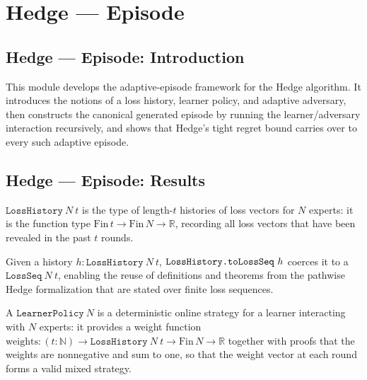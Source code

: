 \section{Hedge --- Episode}
\subsection*{Hedge --- Episode: Introduction}

This module develops the adaptive-episode framework for the Hedge algorithm.
It introduces the notions of a loss history, learner policy, and adaptive adversary,
then constructs the canonical generated episode by running the learner/adversary
interaction recursively, and shows that Hedge's tight regret bound carries over
to every such adaptive episode.

\subsection*{Hedge --- Episode: Results}

\begin{definition}
\label{LossHistory}
\leanok
$\texttt{LossHistory}\ N\ t$ is the type of length-$t$ histories of loss vectors
for $N$ experts: it is the function type $\mathrm{Fin}\,t \to \mathrm{Fin}\,N \to \mathbb{R}$,
recording all loss vectors that have been revealed in the past $t$ rounds.
\end{definition}

\begin{definition}
\label{LossHistory.toLossSeq}
\leanok
{}
Given a history $h : \texttt{LossHistory}\ N\ t$, $\text{\texttt{LossHistory.toLossSeq}}\ h$ coerces it
to a $\texttt{LossSeq}\ N\ t$, enabling the reuse of definitions and theorems from
the pathwise Hedge formalization that are stated over finite loss sequences.
\end{definition}

\begin{definition}
\label{LearnerPolicy}
\leanok
{}
A $\texttt{LearnerPolicy}\ N$ is a deterministic online strategy for a learner
interacting with $N$ experts: it provides a weight function
$\mathrm{weights} : (t : \mathbb{N}) \to \texttt{LossHistory}\ N\ t \to \mathrm{Fin}\,N \to \mathbb{R}$
together with proofs that the weights are nonnegative and sum to one,
so that the weight vector at each round forms a valid mixed strategy.
\end{definition}

